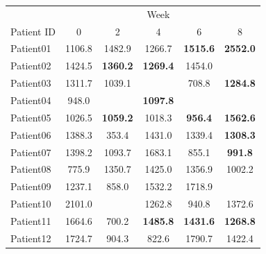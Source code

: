 \documentclass[12pt, oneside]{article}   	%
\begin{document}
\break

\begin{table}[H]
   \centering
   \begin{tabular}{@{} lccccc @{}} %
      \toprule
       &  &  &  Week & & \\
      \cmidrule(l){2-6} %
      Patient ID & 0 & 2 & 4 & 6 & 8 \\
      \midrule
      Patient01 & 1106.8 & 1482.9 & 1266.7 & \textbf{1515.6} & \textbf{2552.0}\\
      Patient02 & 1424.5 & \textbf{1360.2} & \textbf{1269.4} & 1454.0 &\\
      Patient03 & 1311.7 & 1039.1 &  & 708.8 & \textbf{1284.8}\\
      Patient04 & 948.0 &  & \textbf{1097.8} &  & \\
      Patient05 & 1026.5 & \textbf{1059.2} & 1018.3 &  \textbf{956.4} &  \textbf{1562.6} \\
      Patient06 & 1388.3 & 353.4 & 1431.0 & 1339.4 &  \textbf{1308.3} \\
      Patient07 & 1398.2 & 1093.7 & 1683.1 & 855.1&  \textbf{991.8} \\
      Patient08 & 775.9 & 1350.7 & 1425.0 & 1356.9 & 1002.2 \\
      Patient09 & 1237.1 & 858.0 & 1532.2 & 1718.9 & \\
      Patient10 & 2101.0 &  & 1262.8 & 940.8 & 1372.6 \\
      Patient11 & 1664.6 & 700.2 &  \textbf{1485.8} & \textbf{1431.6} &  \textbf{1268.8} \\
      Patient12 & 1724.7 & 904.3 & 822.6 & 1790.7 & 1422.4 \\
      \bottomrule
   \end{tabular}
\label{tab:depth}
\end{table}

\break
\end{document}
